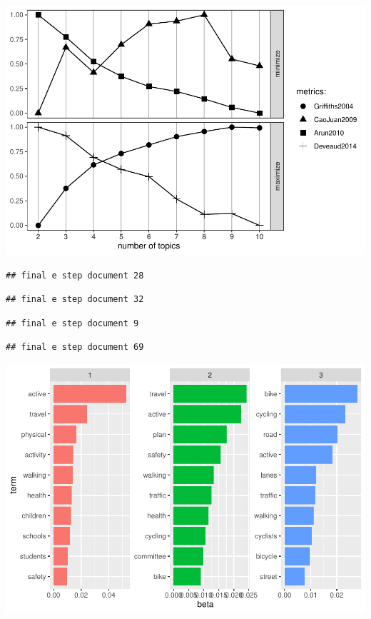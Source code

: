 \documentclass[]{elsarticle} %
\begin{document}
\includegraphics{AST-Framing-Ontario_files/figure-latex/evaluate-lda-4.pdf}

\begin{verbatim}
## final e step document 28
\end{verbatim}

\begin{verbatim}
## final e step document 32
\end{verbatim}

\begin{verbatim}
## final e step document 9
\end{verbatim}

\begin{verbatim}
## final e step document 69
\end{verbatim}

\includegraphics{AST-Framing-Ontario_files/figure-latex/municipal-terms-1.pdf}
\end{document}
